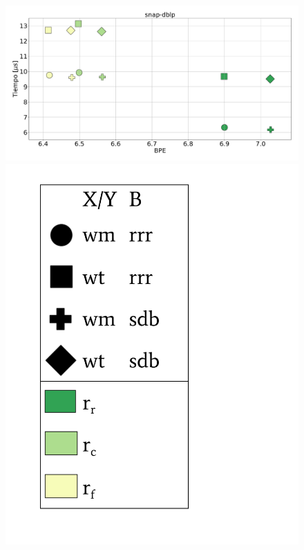 \begin{figure}
    	\centering
    	\begin{minipage}{1\textwidth}
    			\centering
    			\begin{minipage}{0.8\textwidth}
    				\centering
    				\includegraphics[width=1\linewidth]{img/sdsl/aleatorioBig/snap-dblp.pdf}
    			\end{minipage}
    			\begin{minipage}{0.15\textwidth}
    				\centering
    				\includegraphics[scale=.22, clip, trim=70 0 0 0]{img/sdsl/label.pdf}
    			\end{minipage}
    			

\end{minipage}
\end{figure}
